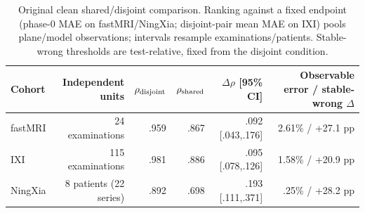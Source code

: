 \begin{table}[t]
\centering
\caption{Original clean shared/disjoint comparison. Ranking against a fixed endpoint (phase-0 MAE on fastMRI/NingXia; disjoint-pair mean MAE on IXI) pools plane/model observations; intervals resample examinations/patients. Stable-wrong thresholds are test-relative, fixed from the disjoint condition.}
\label{tab:historical-controlled}
\setlength{\tabcolsep}{4pt}
\begin{tabular}{lrrrrr}
\toprule
Cohort & Independent units & $\rho_{\rm disjoint}$ & $\rho_{\rm shared}$ & $\Delta\rho$ [95\% CI] & Observable error / stable-wrong $\Delta$ \\
\midrule
fastMRI & 24 examinations & .959 & .867 & .092 [.043,.176] & 2.61\% / +27.1 pp \\
IXI & 115 examinations & .981 & .886 & .095 [.078,.126] & 1.58\% / +20.9 pp \\
NingXia & 8 patients (22 series) & .892 & .698 & .193 [.111,.371] & .25\% / +28.2 pp \\
\bottomrule
\end{tabular}
\end{table}